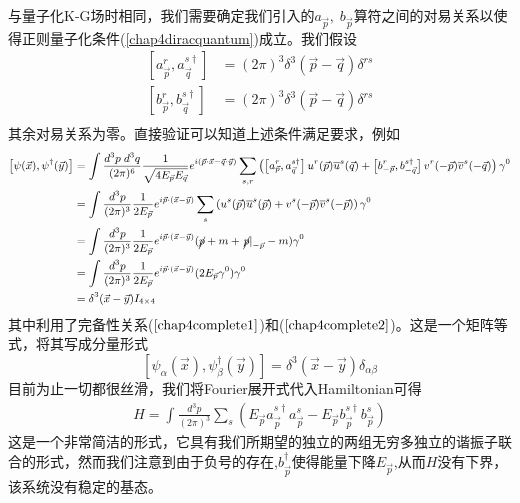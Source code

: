 与量子化K-G场时相同，我们需要确定我们引入的$a_{\vec{p}},\;b_{\vec{p}}$算符之间的对易关系以使得正则量子化条件(\ref{chap4diracquantum})成立。我们假设
\begin{equation}
    \begin{aligned}
    \left[a^{r}_{\vec{p}},a^{s\dagger}_{\vec{q}}\right]&=(2\pi)^{3}\delta^{3}(\vec{p}-\vec{q})\delta^{rs}\\
        \left[b^{r}_{\vec{p}},b^{s\dagger}_{\vec{q}}\right]&=(2\pi)^{3}\delta^{3}(\vec{p}-\vec{q})\delta^{rs}\\
    \end{aligned}
\end{equation}
其余对易关系为零。直接验证可以知道上述条件满足要求，例如
\begin{equation}
\small
    \begin{aligned}
    \left[\psi(\vec{x}),\psi^{\dagger}(\vec{y})\right]&=\int \frac{d^{3}p\;d^{3}q}{(2\pi)^{6}}\frac{1}{\sqrt{4E_{\vec{p}}E_{\vec{q}}}}e^{i(\vec{p}\cdot\vec{x}-\vec{q}\cdot\vec{y})}\sum\limits_{s,r}\left(\left[a^{r}_{\vec{p}},a^{s\dagger}_{\vec{q}}\right]u^{r}(\vec{p})\overline{u}^{s}(\vec{q})+\left[b^{r}_{-\vec{p}},b^{s\dagger}_{-\vec{q}}\right]v^{r}(-\vec{p})\overline{v}^{s}(-\vec{q})\right)\gamma^{0}\\
    &=\int \frac{d^{3}p}{(2\pi)^{3}}\frac{1}{2E_{\vec{p}}}e^{i\vec{p}\cdot(\vec{x}-\vec{y})}\sum\limits_{s}\left(u^{s}(\vec{p})\overline{u}^{s}(\vec{p})+v^{s}(-\vec{p})\overline{v}^{s}(-\vec{p})\right)\gamma^{0}\\
    &=\int \frac{d^{3}p}{(2\pi)^{3}}\frac{1}{2E_{\vec{p}}}e^{i\vec{p}\cdot(\vec{x}-\vec{y})}(\cancel{p}+m+\left.\cancel{p}\right|_{-\vec{p}}-m)\gamma^{0}\\
     &=\int \frac{d^{3}p}{(2\pi)^{3}}\frac{1}{2E_{\vec{p}}}e^{i\vec{p}\cdot(\vec{x}-\vec{y})}(2E_{\vec{p}}\gamma^{0})\gamma^{0}\\
       &=\delta^{3}(\vec{x}-\vec{y})I_{4\times 4}
    \end{aligned}
\end{equation}
其中利用了完备性关系($\ref{chap4complete1}$)和($\ref{chap4complete2}$)。这是一个矩阵等式，将其写成分量形式
\begin{equation}
     \left[\psi_{\alpha}(\vec{x}),\psi_{\beta}^{\dagger}(\vec{y})\right]=\delta^{3}(\vec{x}-\vec{y})\delta_{\alpha\beta}
     \end{equation}
目前为止一切都很丝滑，我们将Fourier展开式代入Hamiltonian可得
\begin{equation}
    \begin{aligned}
    H=\int \frac{d^{3}p}{(2\pi)^{3}}\sum\limits_{s}\left(E_{\vec{p}}a^{s\dagger}_{\vec{p}}a^{s}_{\vec{p}}-E_{\vec{p}}b^{s\dagger}_{\vec{p}}b^{s}_{\vec{p}}\right)
    \end{aligned}
\end{equation}
这是一个非常简洁的形式，它具有我们所期望的独立的两组无穷多独立的谐振子联合的形式，然而我们注意到由于负号的存在,$b^{\dagger}_{\vec{p}}$使得能量下降$E_{\vec{p}}$,从而$H$没有下界，该系统没有稳定的基态。

